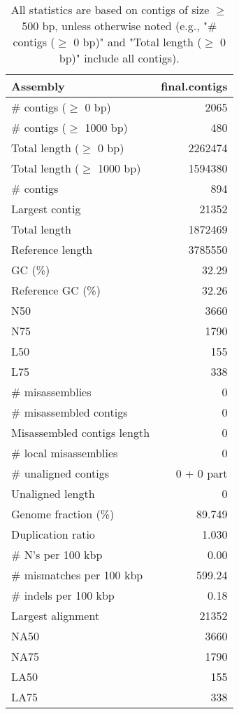 \documentclass[12pt,a4paper]{article}
\begin{document}
\begin{table}[ht]
\begin{center}
\caption{All statistics are based on contigs of size $\geq$ 500 bp, unless otherwise noted (e.g., "\# contigs ($\geq$ 0 bp)" and "Total length ($\geq$ 0 bp)" include all contigs).}
\begin{tabular}{|l*{1}{|r}|}
\hline
Assembly & final.contigs \\ \hline
\# contigs ($\geq$ 0 bp) & 2065 \\ \hline
\# contigs ($\geq$ 1000 bp) & 480 \\ \hline
Total length ($\geq$ 0 bp) & 2262474 \\ \hline
Total length ($\geq$ 1000 bp) & 1594380 \\ \hline
\# contigs & 894 \\ \hline
Largest contig & 21352 \\ \hline
Total length & 1872469 \\ \hline
Reference length & 3785550 \\ \hline
GC (\%) & 32.29 \\ \hline
Reference GC (\%) & 32.26 \\ \hline
N50 & 3660 \\ \hline
N75 & 1790 \\ \hline
L50 & 155 \\ \hline
L75 & 338 \\ \hline
\# misassemblies & 0 \\ \hline
\# misassembled contigs & 0 \\ \hline
Misassembled contigs length & 0 \\ \hline
\# local misassemblies & 0 \\ \hline
\# unaligned contigs & 0 + 0 part \\ \hline
Unaligned length & 0 \\ \hline
Genome fraction (\%) & 89.749 \\ \hline
Duplication ratio & 1.030 \\ \hline
\# N's per 100 kbp & 0.00 \\ \hline
\# mismatches per 100 kbp & 599.24 \\ \hline
\# indels per 100 kbp & 0.18 \\ \hline
Largest alignment & 21352 \\ \hline
NA50 & 3660 \\ \hline
NA75 & 1790 \\ \hline
LA50 & 155 \\ \hline
LA75 & 338 \\ \hline
\end{tabular}
\end{center}
\end{table}
\end{document}

